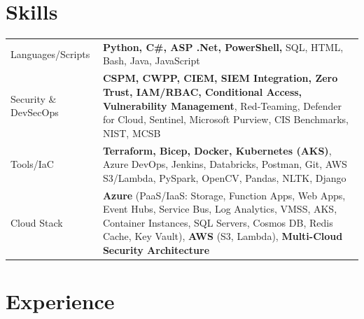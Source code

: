 \documentclass[a4paper,3pt]{article}
\begin{document}
\section{Skills}
\begin{tabularx}{\linewidth}{@{}l X@{}}
    Languages/Scripts  & \normalsize{\textbf{Python, C\#, ASP .Net, PowerShell,} SQL, HTML, Bash, Java, JavaScript}\\
    Security \& DevSecOps & \normalsize{\textbf{CSPM, CWPP, CIEM, SIEM Integration, Zero Trust, IAM/RBAC, Conditional Access, Vulnerability Management}, Red-Teaming, Defender for Cloud, Sentinel, Microsoft Purview, CIS Benchmarks, NIST, MCSB}\\
    Tools/IaC          & \normalsize{\textbf{Terraform, Bicep, Docker, Kubernetes (AKS)}, Azure DevOps, Jenkins, Databricks, Postman, Git, AWS S3/Lambda, PySpark, OpenCV, Pandas, NLTK, Django}\\
    Cloud Stack        & \normalsize{\textbf{Azure} (PaaS/IaaS: Storage, Function Apps, Web Apps, Event Hubs, Service Bus, Log Analytics, VMSS, AKS, Container Instances, SQL Servers, Cosmos DB, Redis Cache, Key Vault), \textbf{AWS} (S3, Lambda), \textbf{Multi-Cloud Security Architecture}}
\end{tabularx}


\section{Experience}
\end{document}
